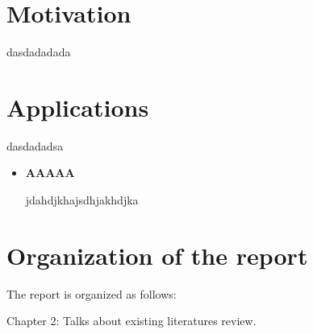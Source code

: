 \section{Motivation}

dasdadadada


\section{Applications}

dasdadadsa

\begin{itemize}
	
	\item \textbf{AAAAA}
	
	jdahdjkhajsdhjakhdjka
	
\end{itemize}


\section{Organization of the report}

The report is organized as follows: 

Chapter 2: Talks about existing literatures review. 
